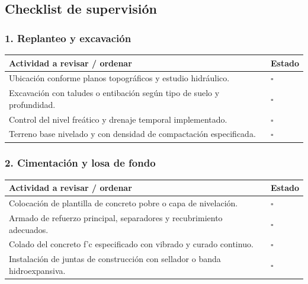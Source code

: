 \documentclass[12pt]{article}
\newcommand{\cbox}{\(\square\)} %
\begin{document}
	\subsection{Checklist de supervisión}
	
	\subsubsection*{1. Replanteo y excavación}
	\begin{tabularx}{\linewidth}{>{\raggedright\arraybackslash}p{0.93\linewidth} >{\centering\arraybackslash}m{0.07\linewidth}}
		\toprule
		\textbf{Actividad a revisar / ordenar} & \textbf{Estado}\\
		\midrule
		Ubicación conforme planos topográficos y estudio hidráulico. & \cbox \\
		Excavación con taludes o entibación según tipo de suelo y profundidad. & \cbox \\
		Control del nivel freático y drenaje temporal implementado. & \cbox \\
		Terreno base nivelado y con densidad de compactación especificada. & \cbox \\
		\bottomrule
	\end{tabularx}
	
	\subsubsection*{2. Cimentación y losa de fondo}
	\begin{tabularx}{\linewidth}{>{\raggedright\arraybackslash}p{0.93\linewidth} >{\centering\arraybackslash}m{0.07\linewidth}}
		\toprule
		\textbf{Actividad a revisar / ordenar} & \textbf{Estado}\\
		\midrule
		Colocación de plantilla de concreto pobre o capa de nivelación. & \cbox \\
		Armado de refuerzo principal, separadores y recubrimiento adecuados. & \cbox \\
		Colado del concreto f’c especificado con vibrado y curado continuo. & \cbox \\
		Instalación de juntas de construcción con sellador o banda hidroexpansiva. & \cbox \\
		\bottomrule
	\end{tabularx}
	
\end{document}
